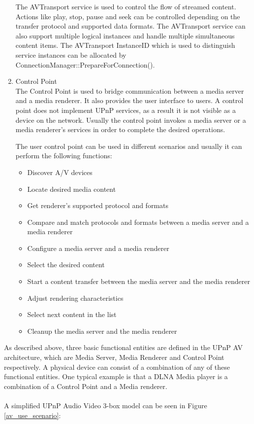 \begin{enumerate}
The AVTransport service is used to control the flow of streamed content. Actions 
like play, stop, pause and seek can be controlled depending on the transfer 
protocol and supported data formats. The AVTransport service can also support 
multiple logical instances and handle multiple simultaneous content items. The 
AVTransport InstanceID which is used to distinguish service instances can be 
allocated by ConnectionManager::PrepareForConnection(). 

\item Control Point \\ 
The Control Point is used to bridge communication between a media server and a media renderer. 
It also provides the user interface to users. A control point does not implement UPnP 
services, as a result it is not visible as a device on the network. Usually the control point 
invokes a media server or a media renderer's services in order to complete the 
desired operations.

The user control point can be used in different scenarios and usually it can 
perform the following functions: 

\begin{itemize} 
\item Discover A/V devices 
\item Locate desired media content 
\item Get renderer's supported protocol and formats 
\item Compare and match protocols and formats between a media server and a media 
renderer 
\item Configure a media server and a media renderer 
\item Select the desired content 
\item Start a content transfer between the media server and the media renderer 
\item Adjust rendering characteristics 
\item Select next content in the list 
\item Cleanup the media server and the media renderer 
\end{itemize} 

\end{enumerate} 

As described above, three basic functional entities are defined in the UPnP AV 
architecture\cite{upnp-av}, which are Media Server, Media Renderer and Control Point respectively.
A physical device can consist of a combination of any of these functional 
entities. One typical example is that a DLNA Media player is a combination of a Control 
Point and a Media renderer. \\
\\
A simplified UPnP Audio Video 3-box model \cite{DLNA_proxy} can be 
seen in Figure \ref{av_use_scenario}: 

